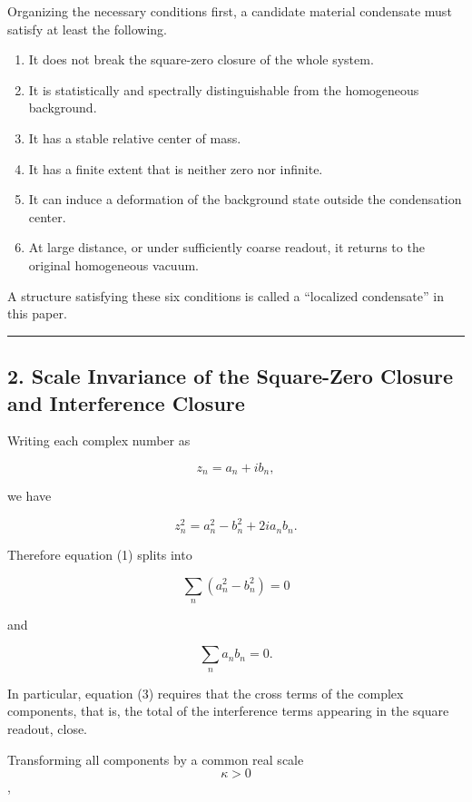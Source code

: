 \documentclass[
  a4paper,
]{article}
\providecommand{\tightlist}{%
  \setlength{\itemsep}{0pt}\setlength{\parskip}{0pt}}
\begin{document}
Organizing the necessary conditions first, a candidate material
condensate must satisfy at least the following.

\begin{enumerate}
\def\labelenumi{\arabic{enumi}.}
\tightlist
\item
  It does not break the square-zero closure of the whole system.
\item
  It is statistically and spectrally distinguishable from the
  homogeneous background.
\item
  It has a stable relative center of mass.
\item
  It has a finite extent that is neither zero nor infinite.
\item
  It can induce a deformation of the background state outside the
  condensation center.
\item
  At large distance, or under sufficiently coarse readout, it returns to
  the original homogeneous vacuum.
\end{enumerate}

A structure satisfying these six conditions is called a ``localized
condensate'' in this paper.

\begin{center}\rule{0.5\linewidth}{0.5pt}\end{center}

\subsection{2. Scale Invariance of the Square-Zero Closure and
Interference
Closure}\label{scale-invariance-of-the-square-zero-closure-and-interference-closure}

Writing each complex number as

\[
z_n=a_n+i b_n,
\]

we have

\[
z_n^2
=
a_n^2-b_n^2
+
2i a_n b_n.
\]

Therefore equation (1) splits into

\[
\sum_n(a_n^2-b_n^2)=0
\tag{2}
\]

and

\[
\sum_n a_n b_n=0.
\tag{3}
\]

In particular, equation (3) requires that the cross terms of the complex
components, that is, the total of the interference terms appearing in
the square readout, close.

Transforming all components by a common real scale \[\kappa>0\],
\end{document}
